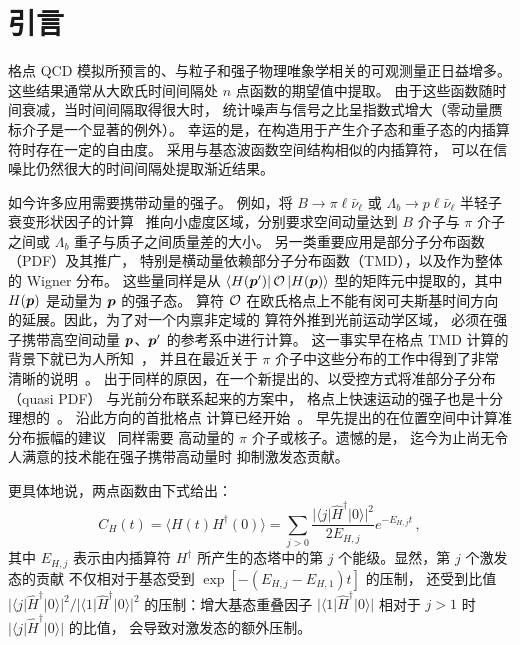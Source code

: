 \section{引言}
格点 QCD 模拟所预言的、与粒子和强子物理唯象学相关的可观测量正日益增多。
这些结果通常从大欧氏时间间隔处 $n$ 点函数的期望值中提取。
由于这些函数随时间衰减，当时间间隔取得很大时，
统计噪声与信号之比呈指数式增大（零动量赝标介子是一个显著的例外）。
幸运的是，在构造用于产生介子态和重子态的内插算符时存在一定的自由度。
采用与基态波函数空间结构相似的内插算符，
可以在信噪比仍然很大的时间间隔处提取渐近结果。

如今许多应用需要携带动量的强子。
例如，将 $B\rightarrow\pi\ell\bar{\nu}_{\ell}$ 或
$\Lambda_b\rightarrow p\ell\bar{\nu}_{\ell}$
半轻子衰变形状因子的计算~\cite{Detmold:2015aaa}
推向小虚度区域，分别要求空间动量达到
$B$ 介子与 $\pi$ 介子之间或 $\Lambda_b$ 重子与质子之间质量差的大小。
另一类重要应用是部分子分布函数（PDF）及其推广，
特别是横动量依赖部分子分布函数（TMD），以及作为整体的 Wigner 分布。
这些量同样是从 $ \left\langle H(\boldsymbol{p}') \right| \mathcal{O} \left| H(\boldsymbol{p}) \right\rangle$ 型的矩阵元中提取的，其中 $H(\boldsymbol{p})$
是动量为 $\boldsymbol{p}$ 的强子态。
算符 $\mathcal{O}$ 在欧氏格点上不能有闵可夫斯基时间方向的延展。因此，为了对一个内禀非定域的
算符外推到光前运动学区域，
必须在强子携带高空间动量 $\boldsymbol{p}$、$\boldsymbol{p}'$ 的参考系中进行计算。
这一事实早在格点 TMD 计算的背景下就已为人所知~\cite{Hagler:2009mb,Musch:2010ka,Musch:2011er}，
并且在最近关于 $\pi$ 介子中这些分布的工作中得到了非常清晰的说明~\cite{Engelhardt:2015xja}。
出于同样的原因，在一个新提出的、以受控方式将准部分子分布（quasi PDF）
与光前分布联系起来的方案中，
格点上快速运动的强子也是十分理想的~\cite{Ji:2013dva,Ji:2015jwa}。
沿此方向的首批格点
计算已经开始~\cite{Lin:2014zya,Alexandrou:2015rja}。
早先提出的在位置空间中计算准分布振幅的建议~\cite{Aglietti:1998ur,Abada:2001if,Braun:2007wv}
同样需要
高动量的 $\pi$ 介子或核子。遗憾的是，
迄今为止尚无令人满意的技术能在强子携带高动量时
抑制激发态贡献。

更具体地说，两点函数由下式给出：
\begin{equation}
\label{eq:twopoint}
C_H(t)=\langle H(t)H^{\dagger}(0)\rangle
=\sum_{j>0}\frac{|\langle j|\hat{H}^{\dagger}|0\rangle|^2}{2E_{H,j}}e^{-E_{H,j}t}\,,
\end{equation}
其中 $E_{H,j}$ 表示由内插算符
$H^{\dagger}$ 所产生的态塔中的第 $j$ 个能级。显然，第 $j$ 个激发态的贡献
不仅相对于基态受到 $\exp[-(E_{H,j}-E_{H,1})t]$ 的压制，
还受到比值
$|\langle j|\hat{H}^{\dagger}|0\rangle|^2/|\langle 1|\hat{H}^{\dagger}|0\rangle|^2$
的压制：增大基态重叠因子
$|\langle 1|\hat{H}^{\dagger}|0\rangle|$
相对于 $j>1$ 时 $|\langle j|\hat{H}^{\dagger}|0\rangle|$ 的比值，
会导致对激发态的额外压制。

